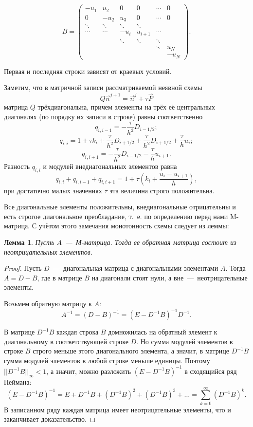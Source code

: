 \documentclass[14pt, a4paper, fleqn]{extarticle}
\newtheorem{Lemma}{Лемма}
\begin{document}
$$B=\left(\begin{matrix}
-u_1 &  u_2 & 0   & 0  & \cdots & 0 \\
0    & -u_2 & u_3 & 0  & \cdots & 0 \\         
\ddots & \ddots & \ddots & \ddots \\
\cdots & \cdots & -u_i & u_{i+1} &  \cdots &  \\
& & \ddots & \ddots & \ddots\\
& & & & \ddots& u_N\\
& & & & & -u_N
\end{matrix}\right).$$

\smallskip

Первая и последняя строки зависят от краевых условий.

Заметим, что в матричной записи рассматриваемой неявной схемы $$Q\vec{n}^{j+1}=\vec{n}^j + \tau \vec{P}$$ матрица $Q$ трёхдиагональна, причем элементы на трёх её центральных диагоналях (по порядку их записи в строке) равны соответственно $$q_{i, i-1} = -\dfrac{\tau}{h^2}D_{i-1/2};$$ $$q_{i, i} = 1+\tau k_i + \dfrac{\tau}{h^2}D_{i+1/2}+\dfrac{\tau}{h^2}D_{i+1/2}+\dfrac{\tau}{h}u_i;$$ $$q_{i, i+1} = -\dfrac{\tau}{h^2}D_{i-1/2}-\dfrac{\tau}{h}u_{i+1}.$$
Разность $q_{i,i}$ и модулей внедиагональных элементов равна $$q_{i, i} + q_{i, i-1} + q_{i, i+1} = 1+\tau\left(k_i+\dfrac{u_i-u_{i+1}}{h}\right),$$ при достаточно малых значениях $\tau$ эта величина строго положительна. 

Все диагональные элементы положительны, внедиагональные отрицательны и есть строгое диагональное преобладание, т.~е. по определению перед нами M-матрица. С учётом этого замечания монотонность схемы следует из леммы:

\begin{Lemma} Пусть $A$~---~М-матрица. Тогда ее обратная матрица состоит из неотрицательных элементов.\end{Lemma}

\begin{proof} Пусть $D$~---~диагональная матрица с диагональными элементами $A$. Тогда $A=D-B$, где в матрице $B$ на диагонали стоят нули, а вне~---~неотрицательные элементы.

Возьмем обратную матрицу к $A$: $$A^{-1}=(D-B)^{-1}=(E-D^{-1}B)^{-1}D^{-1}.$$

В матрице $D^{-1}B$ каждая строка $B$ домножилась на обратный элемент к диагональному в соответствующей строке $D$. Но сумма модулей элементов в строке $B$ строго меньше этого диагонального элемента, а значит, в матрице $D^{-1}B$ сумма модулей элементов в любой строке меньше единицы. Поэтому $||D^{-1}B||_\infty<1$, а значит, можно разложить $(E-D^{-1}B)^{-1}$ в сходящийся ряд Неймана: $$(E-D^{-1}B)^{-1} = E+D^{-1}B + (D^{-1}B)^2+(D^{-1}B)^3+\dots =\displaystyle\sum_{k=0}^\infty (D^{-1}B)^k.$$
В записанном ряду каждая матрица имеет неотрицательные элементы, что и заканчивает доказательство. \end{proof}
\end{document}
